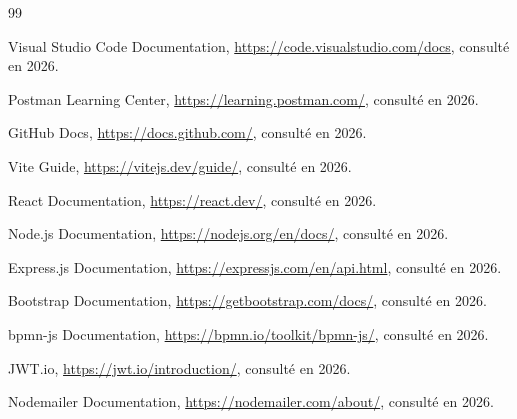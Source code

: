 \begin{thebibliography}{99}

Visual Studio Code Documentation, \url{https://code.visualstudio.com/docs}, consulté en 2026.

Postman Learning Center, \url{https://learning.postman.com/}, consulté en 2026.

GitHub Docs, \url{https://docs.github.com/}, consulté en 2026.

Vite Guide, \url{https://vitejs.dev/guide/}, consulté en 2026.

React Documentation, \url{https://react.dev/}, consulté en 2026.

Node.js Documentation, \url{https://nodejs.org/en/docs/}, consulté en 2026.

Express.js Documentation, \url{https://expressjs.com/en/api.html}, consulté en 2026.

Bootstrap Documentation, \url{https://getbootstrap.com/docs/}, consulté en 2026.

bpmn-js Documentation, \url{https://bpmn.io/toolkit/bpmn-js/}, consulté en 2026.

JWT.io, \url{https://jwt.io/introduction/}, consulté en 2026.

Nodemailer Documentation, \url{https://nodemailer.com/about/}, consulté en 2026.
\end{thebibliography}
